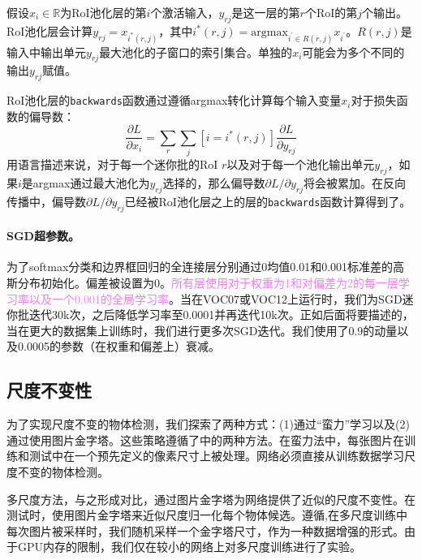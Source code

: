 \documentclass[../main]{subfile}
\begin{document}
假设$x_i \in \mathbb{R}$为RoI池化层的第$i$个激活输入，$y_{rj}$是这一层的第$r$个RoI的第$j$个输出。RoI池化层会计算$y_{rj} = x_{i^*(r, j)}$，其中$i^*(r, j) = \text{argmax}_{i^{'}\in R(r, j)}x_{i^{'}}$。$R(r, j)$是输入中输出单元$y_{rj}$最大池化的子窗口的索引集合。单独的$x_i$可能会为多个不同的输出$y_{rj}$赋值。

RoI池化层的\lstinline{backwards}函数通过遵循argmax转化计算每个输入变量$x_i$对于损失函数的偏导数：
\begin{equation}
    \frac{\partial L}{\partial x_i} = \sum_r \sum_j [i = i^*(r, j)] \frac{\partial L}{\partial y_{rj}}
\end{equation}
用语言描述来说，对于每一个迷你批的RoI $r$以及对于每一个池化输出单元$y_{rj}$，如果$i$是argmax通过最大池化为$y_{rj}$选择的，那么偏导数$\partial L / \partial y_{rj}$将会被累加。在反向传播中，偏导数$\partial L / \partial y_{rj}$已经被RoI池化层之上的层的\lstinline{backwards}函数计算得到了。

\paragraph{SGD超参数。}为了softmax分类和边界框回归的全连接层分别通过0均值0.01和0.001标准差的高斯分布初始化。偏差被设置为0。\textcolor{violet}{所有层使用对于权重为1和对偏差为2的每一层学习率以及一个0.001的全局学习率}。当在VOC07或VOC12上运行时，我们为SGD迷你批迭代30k次，之后降低学习率至0.0001并再迭代10k次。正如后面将要描述的，当在更大的数据集上训练时，我们进行更多次SGD迭代。我们使用了0.9的动量以及0.0005的参数（在权重和偏差上）衰减。

\subsection{尺度不变性}

为了实现尺度不变的物体检测，我们探索了两种方式：(1)通过“蛮力”学习以及(2)通过使用图片金字塔。这些策略遵循了\cite{spp}中的两种方法。在蛮力法中，每张图片在训练和测试中在一个预先定义的像素尺寸上被处理。网络必须直接从训练数据学习尺度不变的物体检测。

多尺度方法，与之形成对比，通过图片金字塔为网络提供了近似的尺度不变性。在测试时，使用图片金字塔来近似尺度归一化每个物体候选。遵循\cite{spp},在多尺度训练中每次图片被采样时，我们随机采样一个金字塔尺寸，作为一种数据增强的形式。由于GPU内存的限制，我们仅在较小的网络上对多尺度训练进行了实验。
\end{document}

